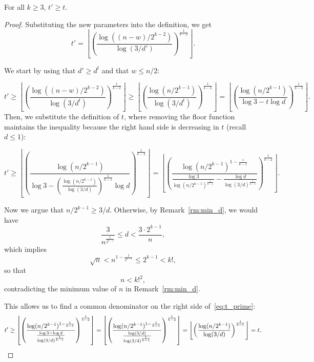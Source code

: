 \begin{lemma}\label{lm:t_prime}
    For all $k \geq 3$, $t' \geq t$.

    \begin{proof}

        Substituting the new parameters into the definition, we get
        \[
            t' = \left\lfloor \left(\frac{\log ((n-w)/2^{k-2})}{\log (3/d')} \right)^
            {\frac{1}{k-2}} \right\rfloor.
        \]

        We start by using that $d' \geq d^t$ and that $w \leq n/2$:

        \[
            t' \geq
            \left\lfloor \left(  \frac{\log ((n-w)/2^{k-2})}{\log (3/d^t)} \right)^
            {\frac{1}{k-2}} \right\rfloor \geq
            \left\lfloor \left(  \frac{\log (n/2^{k-1})}{\log (3/d^t)} \right)^{\frac{1}{k-2}} \right\rfloor =
            \left\lfloor \left(  \frac{\log (n / 2^{k-1})}{\log 3 - t \log d} \right)^
            {\frac{1}{k-2}} \right\rfloor.
        \]
        Then, we substitute the definition of $t$, where removing the floor function
        maintains the inequality because the right hand side is decreasing in $t$ (recall $d \leq 1$):

        \begin{equation} \label{eq:t_prime}
            t' \geq
            \left\lfloor \left(  \frac{\log (n / 2^{k-1})}
            {\log 3 - \left(  \frac{\log (n / 2^{k-1})}{\log (3/d)} \right)^{\frac{1}{k-1}}  \log d} \right)^
            {\frac{1}{k-2}} \right\rfloor
            =
            \left\lfloor \left(  \frac{\log (n / 2^{k-1})^{1-\frac{1}{k-1}}}
            {\frac{\log 3}{\log(n / 2^{k-1})^{\frac{1}{k-1}}} - \frac{\log d}{\log (3/d)^{\frac{1}{k-1}}} }
            \right)^{\frac{1}{k-2}} \right\rfloor.
        \end{equation}

        Now we argue that $n/2^{k-1} \geq 3/d$.
        Otherwise, by Remark~\ref{rm:min_d}, we would have
        \[
            \frac{3}{n^{\frac{1}{2^{k-1}}}} \leq d < \frac{3 \cdot 2^{k-1}}{n},
        \]
        which implies
        \[
            \sqrt{n} < n^{1 - \frac{1}{2^{k-1}}} \leq 2^{k-1} < k!,
        \]
        so that
        \[
            n < k!^2,
        \]
        contradicting the minimum value of $n$ in Remark~\ref{rm:min_d}.

        This allows us to find a common denominator on the
        right side of~\eqref{eq:t_prime}:
        \[
            t' \geq
            \left\lfloor \left(  \frac{\log (n / 2^{k-1})^{1-\frac{1}{k-1}}}
            {\frac{\log 3 - \log d}{\log(3 / d)^{\frac{1}{k-1}}} } \right)^
            {\frac{1}{k-2}} \right\rfloor =
            \left\lfloor \left(  \frac{\log (n / 2^{k-1})^{1-\frac{1}{k-1}}}
            {\frac{\log (3 / d)}{\log(3 / d)^{\frac{1}{k-1}}} } \right)^
            {\frac{1}{k-2}} \right\rfloor =
            \left\lfloor \left(  \frac{\log (n / 2^{k-1})}
            {\log (3 / d)} \right)^
            {\frac{1}{k-1}} \right\rfloor =
            t. \qedhere
        \]
    \end{proof}
\end{lemma}


